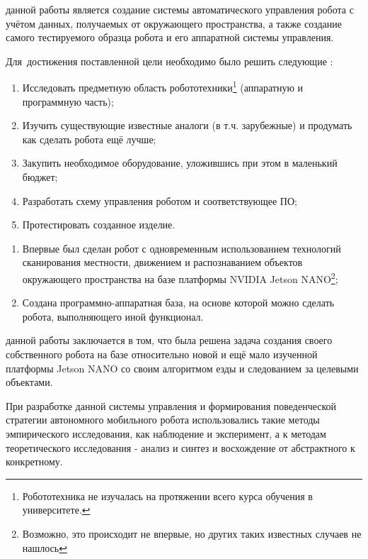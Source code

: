 
{\actuality} 


{\progress}

{\aim} данной работы является создание системы автоматического управления робота с учётом данных, получаемых от окружающего пространства, а также создание самого тестируемого образца робота и его аппаратной системы управления. 

Для~достижения поставленной цели необходимо было решить следующие {\tasks}:
\begin{enumerate}
  \item Исследовать предметную область робототехники\footnote{Робототехника не изучалась на протяжении всего курса обучения в университете.} (аппаратную и программную часть);
  \item Изучить существующие известные аналоги (в т.ч. зарубежные) и продумать как сделать робота ещё лучше;
  \item Закупить необходимое оборудование, уложившись при этом в маленький бюджет; 
  \item Разработать схему управления роботом и соответствующее ПО;
  \item Протестировать созданное изделие.
\end{enumerate}


{\novelty}
\begin{enumerate}
  \item Впервые был сделан робот с одновременным использованием технологий сканирования местности, движением и распознаванием объектов окружающего пространства на базе платформы NVIDIA Jetson NANO\footnote{Возможно, это происходит не впервые, но других таких известных случаев не нашлось};
  \item Создана программно-аппаратная база, на основе которой можно сделать робота, выполняющего иной функционал.
\end{enumerate}

{\influence} данной работы заключается в том, что была решена задача создания своего собственного робота на базе относительно новой и ещё мало изученной платформы Jetson NANO со своим алгоритмом езды и следованием за целевыми объектами. 

{\methods} При разработке данной системы управления и формирования поведенческой стратегии автономного мобильного робота использовались такие методы эмпирического исследования, как наблюдение и эксперимент, а к методам теоретического исследования - анализ и синтез и восхождение от абстрактного к конкретному.
